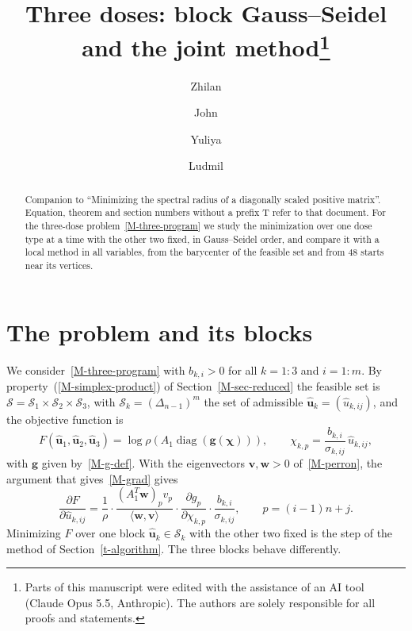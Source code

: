 \documentclass[11pt]{article}
\title{Three doses: block Gauss--Seidel and the joint method\thanks{Parts of this manuscript were edited with the assistance of an AI tool (Claude Opus 5.5, Anthropic). The authors are solely responsible for all proofs and statements.}}
\author{Zhilan \and John \and Yuliya \and Ludmil}
\date{}
\theoremstyle{plain}
\theoremstyle{remark}
\numberwithin{equation}{section}
\begin{document}
\maketitle

\begin{abstract}
Companion to ``Minimizing the spectral radius of a diagonally scaled positive
matrix''. Equation, theorem and section numbers without a prefix T refer to
that document. For the three-dose problem~\eqref{M-three-program} we study the
minimization over one dose type at a time with the other two fixed, in
Gauss--Seidel order, and compare it with a local method in all variables, from
the barycenter of the feasible set and from $48$ starts near its vertices.
\end{abstract}

\section{The problem and its blocks}\label{t-blocks}

We consider~\eqref{M-three-program} with $b_{k,i}>0$ for all $k=1:3$ and
$i=1:m$. By property~(\ref{M-simplex-product}) of Section~\ref{M-sec-reduced}
the feasible set is
$\mathcal{S}=\mathcal{S}_1\times\mathcal{S}_2\times\mathcal{S}_3$, with
$\mathcal{S}_k=\left(\Delta_{n-1}\right)^m$ the set of admissible
$\widehat{\bm u}_k=\left(\widehat u_{k,ij}\right)$, and the objective
function is
\begin{equation}\label{t-F}
F(\widehat{\bm u}_1,\widehat{\bm u}_2,\widehat{\bm u}_3)
=\log\rho\left(A_1\operatorname{diag}\left(\bm g\left(\bm\chi\right)\right)\right),
\qquad \chi_{k,p}=\frac{b_{k,i}}{\sigma_{k,ij}}\,\widehat u_{k,ij},
\end{equation}
with $\bm g$ given by~\eqref{M-g-def}. With the eigenvectors $\bm v,\bm w>0$
of~\eqref{M-perron}, the argument that gives~\eqref{M-grad} gives
\begin{equation}\label{t-grad}
\frac{\partial F}{\partial\widehat u_{k,ij}}
=\frac{1}{\rho}\cdot\frac{\left(A_1^T\bm w\right)_pv_p}{\langle\bm w,\bm v\rangle}
\cdot\frac{\partial g_p}{\partial \chi_{k,p}}\cdot\frac{b_{k,i}}{\sigma_{k,ij}},
\qquad p=(i-1)n+j .
\end{equation}
Minimizing $F$ over one block $\widehat{\bm u}_k\in\mathcal{S}_k$ with the
other two fixed is the step of the method of Section~\ref{t-algorithm}. The
three blocks behave differently.
\end{document}
